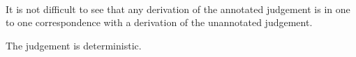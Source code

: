 {\centering
{}}\\

It is not difficult to see that any derivation of the annotated judgement
is in one to one correspondence with a derivation of the unannotated 
judgement.

The judgement is deterministic.\\

